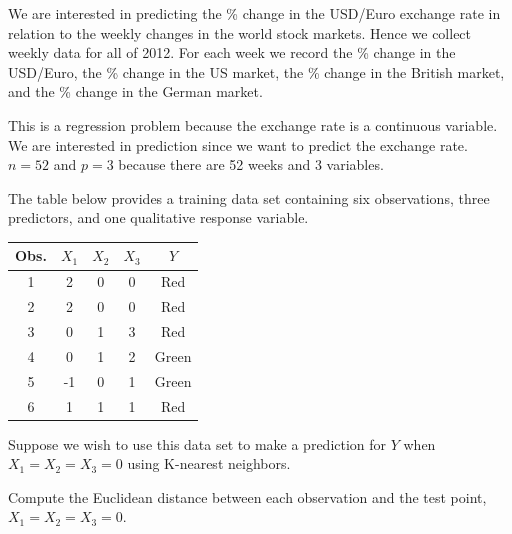 \documentclass{article}
\begin{document}
\begin{probset}
\begin{prob}
\begin{subprobset}
        \begin{subprob}
            We are interested in predicting the \% change in the USD/Euro exchange rate in relation to the weekly changes in the world stock markets. Hence we collect weekly data for all of 2012. For each week we record the \% change in the USD/Euro, the \% change in the US market, the \% change in the British market, and the \% change in the German market.

            \begin{soln}
                This is a regression problem because the exchange rate is a continuous variable. We are interested in prediction since we want to predict the exchange rate. $n = 52$ and $p = 3$ because there are 52 weeks and 3 variables.
            \end{soln}
        \end{subprob}
    \end{subprobset}
\end{prob}

\newpage

\begin{prob}
    The table below provides a training data set containing six observations, three predictors, and one qualitative response variable.

    \begin{center}
        \begin{tabular}{c|cccc}
            \hline
            Obs. & $X_1$ & $X_2$ & $X_3$ & $Y$ \\
            \hline
            1 & 2 & 0 & 0 & Red \\
            2 & 2 & 0 & 0 & Red \\
            3 & 0 & 1 & 3 & Red \\
            4 & 0 & 1 & 2 & Green \\
            5 & -1 & 0 & 1 & Green \\
            6 & 1 & 1 & 1 & Red \\
            \hline
        \end{tabular}
    \end{center}

    Suppose we wish to use this data set to make a prediction for $Y$ when $X_1 = X_2 = X_3 = 0$ using K-nearest neighbors.
    
    \begin{subprobset}
        \begin{subprob}
            Compute the Euclidean distance between each observation and the test point, $X_1 = X_2 = X_3 = 0$.


\end{subprob}
\end{subprobset}
\end{prob}
\end{probset}
\end{document}
